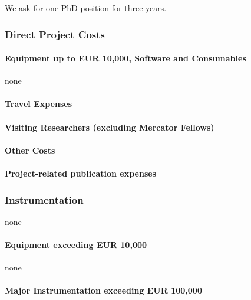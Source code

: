 \documentclass[10pt,fleqn,twoside]{article}
\begin{document}
We ask for one PhD position for three years.

\subsubsection{Direct Project Costs}

\todo{[Text]}

\paragraph{Equipment up to EUR 10,000, Software and Consumables}

none

\paragraph{Travel Expenses}

\todo{[Text]}

\paragraph{Visiting Researchers (excluding Mercator Fellows)}

\todo{[Text]}

\paragraph{Other Costs}

\todo{[Text]}

\paragraph{Project-related publication expenses}

\todo{[Text]}

\subsubsection{Instrumentation}

none

\paragraph{Equipment exceeding EUR 10,000} 

none

\paragraph{Major Instrumentation exceeding EUR 100,000} 
\end{document}
